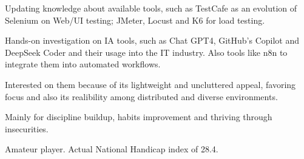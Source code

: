 
\begin{cvparagraph}

	\begin{cvparagraph}
		Updating knowledge about available tools, such as TestCafe as an evolution of Selenium on Web/UI testing; JMeter, Locust and K6 for load testing.
	\end{cvparagraph}


	\begin{cvparagraph}
		Hands-on investigation on IA tools, such as Chat GPT4, GitHub's Copilot and DeepSeek Coder and their usage into the IT industry. Also tools like n8n to integrate them into automated workflows.
	\end{cvparagraph}


	\begin{cvparagraph}
		Interested on them because of its lightweight and uncluttered appeal, favoring focus and also its realibility among distributed and diverse environments.
	\end{cvparagraph}


	\begin{cvparagraph}
		Mainly for discipline buildup, habits improvement and thriving through insecurities.
	\end{cvparagraph}


	\begin{cvparagraph}
		Amateur player. Actual National Handicap index of 28.4.
	\end{cvparagraph}
\end{cvparagraph}
